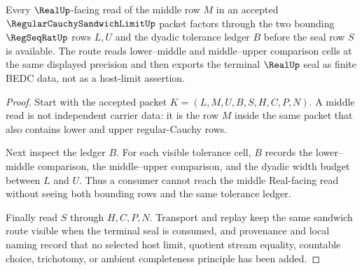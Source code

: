\begin{theorem}
\label{thm:regular-cauchy-sandwich-limit-squeeze-route}
Every $\RealUp$-facing read of the middle row $M$ in an accepted $\RegularCauchySandwichLimitUp$ packet factors through the two bounding $\RegSeqRatUp$ rows $L,U$ and the dyadic tolerance ledger $B$ before the seal row $S$ is available. The route reads lower--middle and middle--upper comparison cells at the same displayed precision and then exports the terminal $\RealUp$ seal as finite BEDC data, not as a host-limit assertion.
\end{theorem}
\begin{proof}
Start with the accepted packet $K=(L,M,U,B,S,H,C,P,N)$. A middle read is not independent carrier data: it is the row $M$ inside the same packet that also contains lower and upper regular-Cauchy rows.

Next inspect the ledger $B$. For each visible tolerance cell, $B$ records the lower--middle comparison, the middle--upper comparison, and the dyadic width budget between $L$ and $U$. Thus a consumer cannot reach the middle Real-facing read without seeing both bounding rows and the same tolerance ledger.

Finally read $S$ through $H,C,P,N$. Transport and replay keep the same sandwich route visible when the terminal seal is consumed, and provenance and local naming record that no selected host limit, quotient stream equality, countable choice, trichotomy, or ambient completeness principle has been added.
\end{proof}


\begin{closurestatus}{\RegularCauchySandwichLimitUp}
  \theoryclosure{\seedClosure}
  \formalstatus{\unformalizedV}
\end{closurestatus}
